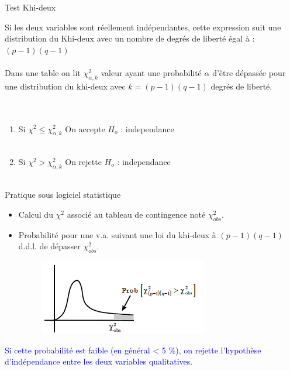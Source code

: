 \documentclass[10pt]{beamer}
\begin{document}
\begin{frame}{Test Khi-deux}

Si les deux variables sont réellement indépendantes, cette expression suit une distribution du Khi-deux avec un nombre de degrés de liberté égal
à : $(p -1) (q -1)$\\~\\

Dans une table on lit $\chi_{\alpha,k}^2$ valeur ayant une probabilité
$\alpha$ d’être dépassée pour une distribution du khi-deux avec $k = (p-1) (q -1)$ degrés de liberté.\\~\\~\\

\begin{enumerate}

\item Si $\chi^2\leq \chi_{\alpha,k}^2$  On accepte $H_o$ : independance \\~\\

\item  Si $\chi^2 > \chi_{\alpha,k}^2$  On rejette $H_o$ : independance \\~\\

\end{enumerate}

\end{frame}
\begin{frame}{Pratique sous logiciel statistique}

\begin{itemize}
\item  Calcul du $\chi^2$ associé au tableau de contingence noté $\chi^2_{obs}$.

\item Probabilité pour une v.a. suivant une loi du khi-deux à
$(p -1) (q -1)$ d.d.l. de dépasser $\chi^2_{obs}$.

\begin{figure}
\includegraphics[scale=0.8]{exemple7.png}  
\end{figure}

\end{itemize}


\textcolor{blue}{Si cette probabilité est faible (en général < 5 \%), on rejette l’hypothèse d’indépendance entre les deux variables qualitatives.}


\end{frame}
\end{document}
